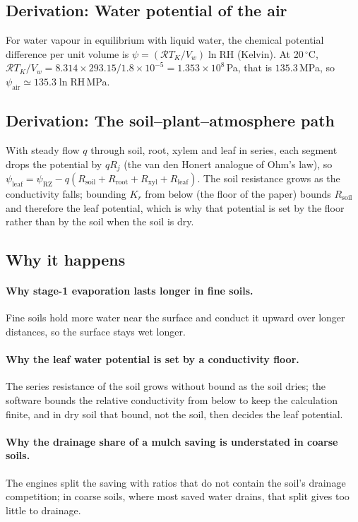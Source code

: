 \subsection{Derivation: Water potential of the air}\label{der:s2:6}
For water vapour in equilibrium with liquid water, the chemical potential difference per unit volume is $\psi=(\mathcal R T_K/V_w)\ln\mathrm{RH}$ (Kelvin). At 20\,$^\circ$C, $\mathcal RT_K/V_w=8.314\times293.15/1.8\times10^{-5}=1.353\times10^{8}$\,Pa, that is $135.3$\,MPa, so $\psi_{\mathrm{air}}\simeq135.3\ln\mathrm{RH}$\,MPa.


\subsection{Derivation: The soil--plant--atmosphere path}\label{der:s2:7}
With steady flow $q$ through soil, root, xylem and leaf in series, each segment drops the potential by $qR_j$ (the van den Honert analogue of Ohm's law), so $\psi_{\mathrm{leaf}}=\psi_{\mathrm{RZ}}-q(R_{\mathrm{soil}}+R_{\mathrm{root}}+R_{\mathrm{xyl}}+R_{\mathrm{leaf}})$. The soil resistance grows as the conductivity falls; bounding $K_r$ from below (the floor of the paper) bounds $R_{\mathrm{soil}}$ and therefore the leaf potential, which is why that potential is set by the floor rather than by the soil when the soil is dry.


\subsection{Why it happens}
\paragraph{Why stage-1 evaporation lasts longer in fine soils.} Fine soils hold more water near the surface and conduct it upward over longer distances, so the surface stays wet longer.

\paragraph{Why the leaf water potential is set by a conductivity floor.} The series resistance of the soil grows without bound as the soil dries; the software bounds the relative conductivity from below to keep the calculation finite, and in dry soil that bound, not the soil, then decides the leaf potential.

\paragraph{Why the drainage share of a mulch saving is understated in coarse soils.} The engines split the saving with ratios that do not contain the soil's drainage competition; in coarse soils, where most saved water drains, that split gives too little to drainage.

